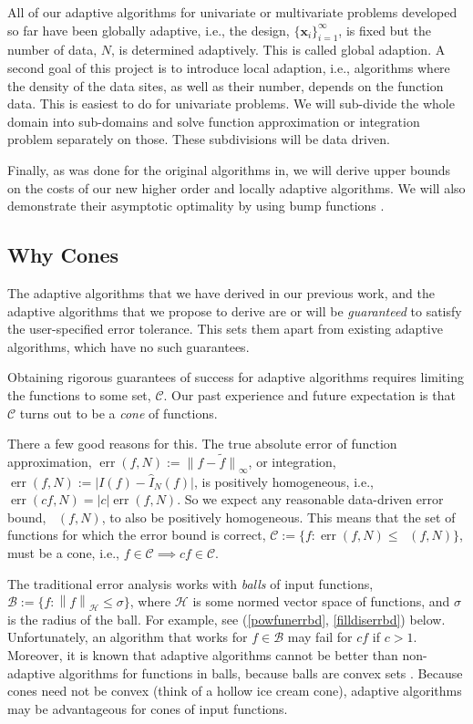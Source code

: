 \documentclass[11pt]{NSFamsart}
\newcommand{\hI}{\hat{I}}
\newcommand{\tf}{\tilde{f}}
\DeclareMathOperator{\err}{err}
\DeclareMathOperator{\oerr}{\overline{\err}}
\newcommand{\bx}{{\boldsymbol{x}}}
\newcommand{\cb}{\mathcal{B}}
\newcommand{\calc}{{\mathcal{C}}}
\def\abs#1{\ensuremath{\left \lvert #1 \right \rvert}}
\newcommand{\bigabs}[1]{\ensuremath{\bigl \lvert #1 \bigr \rvert}}
\newcommand{\norm}[2][{}]{\ensuremath{\left \lVert #2 \right \rVert}_{#1}}
\newcommand{\bignorm}[2][{}]{\ensuremath{\bigl \lVert #2 \bigr \rVert}_{#1}}
\newcommand{\desinf}{\{\bx_i\}_{i=1}^{\infty}}
\newcommand{\ch}{\mathcal{H}}
\begin{document}
All of our adaptive algorithms for univariate or multivariate problems developed so far have been globally adaptive, i.e., the design, $\desinf$, is fixed but the number of data, $N$, is determined adaptively.  This is called global adaption.  A second goal of this project  is to introduce local adaption, i.e., algorithms where the density of the data sites, as well as their number, depends on the function data.  This is easiest to do for univariate problems.  We will sub-divide the whole domain into sub-domains and solve function approximation or integration problem separately on those.  These subdivisions will be data driven.

Finally, as was done for the original algorithms in\citep{HicEtal14b}, we will derive upper bounds on the costs of our new higher order and locally adaptive algorithms.  We will also demonstrate their asymptotic optimality by using bump functions \cite{Nov88,TraWasWoz88}.

\subsection*{Why Cones} The adaptive algorithms that we have derived in our previous work, and the adaptive algorithms that we propose to derive are or will be \emph{guaranteed} to satisfy the user-specified error tolerance.  This sets them apart from existing adaptive algorithms, which have no such guarantees.

Obtaining rigorous guarantees of success for adaptive algorithms requires limiting the functions to some set, $\calc$.  Our past experience and future expectation is that $\calc$ turns out to be a \emph{cone} of functions.

There a few good reasons for this. The true absolute error of function approximation, $\err(f,N):=\bignorm[\infty]{f-\tf}$, or integration, $\err(f,N):= \bigabs{I(f) - \hI_N(f)}$, is positively homogeneous, i.e., $\err(cf,N)=\abs{c} \err(f,N)$. So we expect any reasonable data-driven error bound, $\oerr(f,N)$, to also be positively homogeneous.  This means that the set of functions for which the error bound is correct, $\calc:=\{f : \err(f,N) \le \oerr(f,N)\}$, must be a cone, i.e., $f\in \calc \implies cf \in \calc$.

The traditional error analysis works with \emph{balls} of input functions, $\cb :=\{ f : \norm[\ch]{f} \le \sigma\}$, where $\ch$ is some normed vector space of functions, and $\sigma$ is the radius of the ball.  For example, see (\ref{powfunerrbd}, \ref{filldiserrbd}) below.  Unfortunately, an algorithm that works for $f \in \cb$ may fail for $c f$ if $c>1$.  Moreover, it is known that adaptive algorithms cannot be better than non-adaptive algorithms for functions in balls, because balls are convex sets \cite[Chapter 4, Theorem 5.2.1]{TraWasWoz88}. Because cones need not be convex (think of a hollow ice cream cone), adaptive algorithms may be advantageous for cones of input functions.
\end{document}
